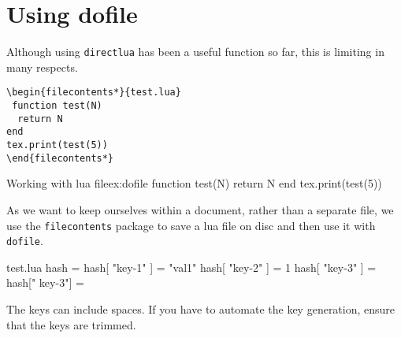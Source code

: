 \section{Using dofile}

Although using \lstinline{directlua} has been a useful function so far, this is limiting in many respects.

\begin{verbatim}
\begin{filecontents*}{test.lua}
 function test(N)
  return N
end
tex.print(test(5))
\end{filecontents*}
\end{verbatim}

\begin{texexample}{Working with lua file}{ex:dofile}
 function test(N)
   return N
 end
 tex.print(test(5))
\end{texexample}

As we want to keep ourselves within a document, rather than a separate file, we
use the \verb+filecontents+ package to save a lua file on disc and then use it with
\lstinline{dofile}.

\begin{phdverbatim}
\begin{filecontents*}{test.lua}
hash = {}
hash[ "key-1" ] = "val1"
hash[ "key-2" ] = 1
hash[ "key-3" ] = {}
hash[" key-3"] = {}
\end{filecontents*}
\end{phdverbatim}

The keys can include spaces. If you have to automate the key generation, ensure that the keys are trimmed.

%
%


